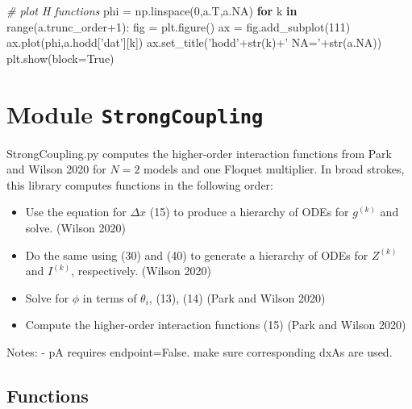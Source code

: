 \documentclass[english,a4paper,oneside]{article}
\newenvironment{Shaded}{}{}
\newcommand{\KeywordTok}[1]{\textcolor[rgb]{0.00,0.44,0.13}{\textbf{#1}}}
\newcommand{\DecValTok}[1]{\textcolor[rgb]{0.25,0.63,0.44}{#1}}
\newcommand{\StringTok}[1]{\textcolor[rgb]{0.25,0.44,0.63}{#1}}
\newcommand{\CommentTok}[1]{\textcolor[rgb]{0.38,0.63,0.69}{\textit{#1}}}
\newcommand{\VariableTok}[1]{\textcolor[rgb]{0.10,0.09,0.49}{#1}}
\newcommand{\ControlFlowTok}[1]{\textcolor[rgb]{0.00,0.44,0.13}{\textbf{#1}}}
\newcommand{\OperatorTok}[1]{\textcolor[rgb]{0.40,0.40,0.40}{#1}}
\newcommand{\BuiltInTok}[1]{#1}
\newcommand{\NormalTok}[1]{#1}
\providecommand{\tightlist}{%
  \setlength{\itemsep}{0pt}\setlength{\parskip}{0pt}}
\begin{document}
\begin{Shaded}
\begin{Highlighting}[]
    \CommentTok{# plot H functions}
\NormalTok{    phi }\OperatorTok{=}\NormalTok{ np.linspace(}\DecValTok{0}\NormalTok{,a.T,a.NA)}
    \ControlFlowTok{for}\NormalTok{ k }\KeywordTok{in} \BuiltInTok{range}\NormalTok{(a.trunc_order}\OperatorTok{+}\DecValTok{1}\NormalTok{):}
\NormalTok{        fig }\OperatorTok{=}\NormalTok{ plt.figure()}
\NormalTok{        ax }\OperatorTok{=}\NormalTok{ fig.add_subplot(}\DecValTok{111}\NormalTok{)}
\NormalTok{        ax.plot(phi,a.hodd[}\StringTok{'dat'}\NormalTok{][k])}
\NormalTok{        ax.set_title(}\StringTok{'hodd'}\OperatorTok{+}\BuiltInTok{str}\NormalTok{(k)}\OperatorTok{+}\StringTok{' NA='}\OperatorTok{+}\BuiltInTok{str}\NormalTok{(a.NA))}
\NormalTok{        plt.show(block}\OperatorTok{=}\VariableTok{True}\NormalTok{)}
\end{Highlighting}
\end{Shaded}

\section{\texorpdfstring{Module
\texttt{StrongCoupling}}{Module StrongCoupling}}\label{StrongCoupling}

StrongCoupling.py computes the higher-order interaction functions from
Park and Wilson 2020 for \(N=2\) models and one Floquet multiplier. In
broad strokes, this library computes functions in the following order:

\begin{itemize}
\tightlist
\item
  Use the equation for \(\Delta x\) (15) to produce a hierarchy of ODEs
  for \(g^{(k)}\) and solve. (Wilson 2020)
\item
  Do the same using (30) and (40) to generate a hierarchy of ODEs for
  \(Z^{(k)}\) and \(I^{(k)}\), respectively. (Wilson 2020)
\item
  Solve for \(\phi\) in terms of \(\theta_i\), (13), (14) (Park and
  Wilson 2020)
\item
  Compute the higher-order interaction functions (15) (Park and Wilson
  2020)
\end{itemize}

Notes: - pA requires endpoint=False. make sure corresponding dxAs are
used.

\subsection{Functions}\label{functions}
\end{document}
